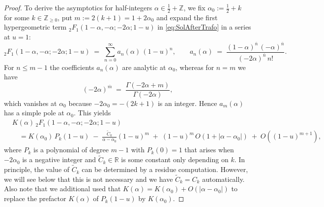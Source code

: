 \documentclass[11pt,a4paper]{article}
\numberwithin{equation}{section}
\def\RR{\mathbb{R}}
\def\ZZ{\mathbb{Z}}
\begin{document}
\begin{proof}
To derive the asymptotics for half-integers $\alpha\in\tfrac{1}{2}+\ZZ$, we fix $\alpha_0:=\tfrac{1}{2}+k$ for some $k\in\ZZ_{\geq 0}$, put $m:=2(k+1)=1+2\alpha_0$ and expand the first hypergeometric term ${}_2F_1(1-\alpha,-\alpha;-2\alpha;1-u)$ in \eqref{eq:SolAfterTrafo} in a series at $u=1$:
\begin{equation}\label{def:an}
  {}_2F_1(1-\alpha,-\alpha;-2\alpha;1-u)
  \;=\; \sum_{n=0}^\infty a_n(\alpha)\,(1-u)^n,
  \qquad
  a_n(\alpha)\;=\;\frac{(1-\alpha)^{\overline{n}}\,(-\alpha)^{\overline{n}}}{(-2\alpha)^{\overline{n}}\,n!}.
\end{equation}
For $n\le m-1$ the coefficients $a_n(\alpha)$ are analytic at $\alpha_0$, whereas for $n=m$ we have
\begin{equation*}
(-2\alpha)^{\overline{m}} \;=\; \frac{\Gamma(-2\alpha+m)}{\Gamma(-2\alpha)},
\end{equation*}
which vanishes at $\alpha_0$ because $-2\alpha_0=-(2k+1)$ is an integer. Hence $a_m(\alpha)$ has a simple pole at $\alpha_0$. This yields
\begin{align*}
  &K(\alpha)\,{}_2F_1(1-\alpha,-\alpha;-2\alpha;1-u)\\
  &\quad= K(\alpha_0)\,P_k(1-u) \;-\; \frac{\widetilde{C}_k}{\alpha-\alpha_0}(1-u)^m
  \;+\; (1-u)^m\,O(1+|\alpha-\alpha_0|) \;+\; O((1-u)^{m+1}),
\end{align*}
where $P_k$ is a polynomial of degree $m-1$ with $P_k(0)=1$ that arises when $-2\alpha_0$ is a negative integer and $\widetilde{C}_k\in\RR$ is some constant only depending on $k$. In principle, the value of $\widetilde{C}_k$ can be determined by a residue computation. However, we will see below that this is not necessary and we have $\widetilde{C}_k=C_k$ automatically. Also note that we additional used that $K(\alpha)=K(\alpha_0)+O(|\alpha-\alpha_0|)$ to replace the prefactor $K(\alpha)$ of $P_k(1-u)$ by $K(\alpha_0)$.


\end{proof}
\end{document}
